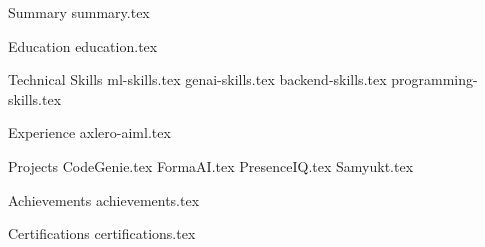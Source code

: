 \documentclass{cv_template}
\begin{document}
\begin{fitpage}

    \makecvheader

    \begin{cvsection}{Summary}
        {summary.tex}
    \end{cvsection}

    \begin{cvsection}{Education}
        {education.tex}
    \end{cvsection}

    \begin{cvsection}{Technical Skills}
        {ml-skills.tex}
        {genai-skills.tex}
        {backend-skills.tex}
        {programming-skills.tex}
    \end{cvsection}

    \begin{cvsection}{Experience}
        {axlero-aiml.tex}
    \end{cvsection}

    \begin{cvsection}{Projects}
        {CodeGenie.tex}
        {FormaAI.tex}
        {PresenceIQ.tex}
        {Samyukt.tex}
    \end{cvsection}

    \begin{cvsection}{Achievements}
        {achievements.tex}
    \end{cvsection}

    \begin{cvsection}{Certifications}
        {certifications.tex}
    \end{cvsection}

\end{fitpage}
\end{document}
